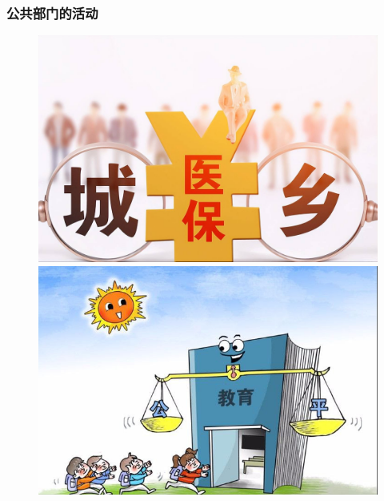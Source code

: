 \documentclass[aspectratio=169, 12pt]{beamer}
\begin{document}
\begin{frame}[plain]
    \frametitle{公共部门的活动}
    \begin{figure}
        \centering
        \begin{minipage}[t]{0.5\linewidth}
            \centering
            \includegraphics[width=1.0\textwidth]{./resources/figure/insurence.jpeg}
        \end{minipage}%
        \begin{minipage}[t]{0.5\linewidth}
            \centering
            \includegraphics[width=1.0\textwidth]{./resources/figure/education.png}
        \end{minipage}
    \end{figure}
\end{frame}
\end{document}

